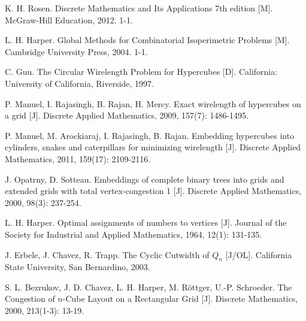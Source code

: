 
\begin{thebibliography}{99}

	K. H. Rosen.
	Discrete Mathematics and Its Applications 7th edition [M].
	McGraw-Hill Education, 2012. 1-1. %

	L. H. Harper.
	Global Methods for Combinatorial Isoperimetric Problems [M].
	Cambridge University Press, 2004. 1-1. %

	C. Guu.
	The Circular Wirelength Problem for Hypercubes [D].
	California: University of California, Riverside, 1997.

	P. Manuel, I. Rajasingh, B. Rajan, H. Mercy.
	Exact wirelength of hypercubes on a grid [J].
	Discrete Applied Mathematics, 2009, 157(7): 1486-1495.

	P. Manuel, M. Arockiaraj, I. Rajasingh, B. Rajan.
	Embedding hypercubes into cylinders, snakes and caterpillars for
	minimizing wirelength [J].
	Discrete Applied Mathematics, 2011, 159(17): 2109-2116.

	J. Opatrny, D. Sotteau.
	Embeddings of complete binary trees into grids and extended grids
	with total vertex-congestion 1 [J].
	Discrete Applied Mathematics, 2000, 98(3): 237-254.

	L. H. Harper.
	Optimal assignments of numbers to vertices [J].
	Journal of the Society for Industrial and Applied Mathematics,
	1964, 12(1): 131-135.

	J. Erbele, J. Chavez, R. Trapp.
	The Cyclic Cutwidth of $Q_n$ [J/OL].
	California State University, San Bernardino, 2003.

	S. L. Bezrukov, J. D. Chavez, L. H. Harper, M. Röttger, U.-P. Schroeder.
	The Congestion of $n$-Cube Layout on a Rectangular Grid [J].
	Discrete Mathematics, 2000, 213(1-3): 13-19.

\end{thebibliography}
